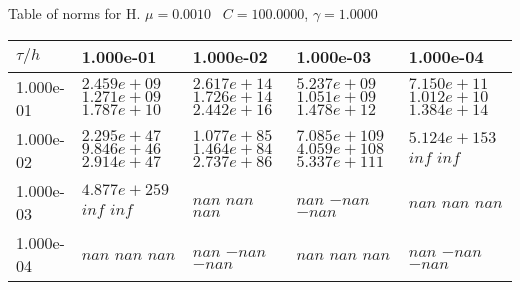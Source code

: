 \begin{center}
Table of norms for H. $\mu = 0.0010$ \, $C = 100.0000$, $\gamma = 1.0000$
  
\begin{tabular}{|p{1in}|p{1in}|p{1in}|p{1in}|p{1in}|} \hline
$\tau / h$ &1.000e-01 &1.000e-02 &1.000e-03 &1.000e-04 \\ \hline 
1.000e-01 & $2.459e+09$  $1.271e+09$  $1.787e+10$  & $2.617e+14$  $1.726e+14$  $2.442e+16$  & $5.237e+09$  $1.051e+09$  $1.478e+12$  & $7.150e+11$  $1.012e+10$  $1.384e+14$  \\ \hline 
1.000e-02 & $2.295e+47$  $9.846e+46$  $2.914e+47$  & $1.077e+85$  $1.464e+84$  $2.737e+86$  & $7.085e+109$  $4.059e+108$  $5.337e+111$  & $5.124e+153$  $inf$  $inf$  \\ \hline 
1.000e-03 & $4.877e+259$  $inf$  $inf$  & $nan$  $nan$  $nan$  & $nan$  $-nan$  $-nan$  & $nan$  $nan$  $nan$  \\ \hline 
1.000e-04 & $nan$  $nan$  $nan$  & $nan$  $-nan$  $-nan$  & $nan$  $nan$  $nan$  & $nan$  $-nan$  $-nan$  \\ \hline 

\end{tabular}\\[20pt]
\end{center}
